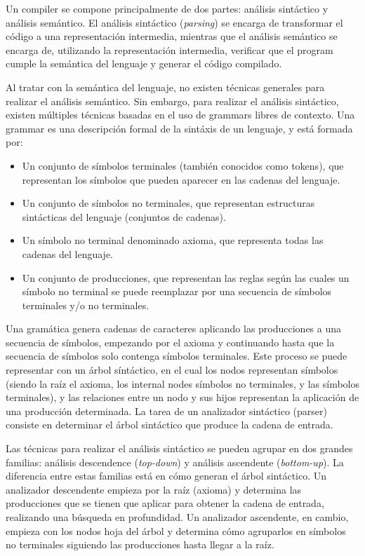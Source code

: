 Un \gls{compiler} se compone principalmente de dos partes: análisis sintáctico y
análisis semántico. El análisis sintáctico (\textit{parsing}) se encarga de
transformar el código a una representación intermedia, mientras que el análisis
semántico se encarga de, utilizando la representación intermedia, verificar que
el \gls{program} cumple la semántica del lenguaje y generar el código compilado.
\parencite{dragon-book}

Al tratar con la semántica del lenguaje, no existen técnicas generales para
realizar el análisis semántico. Sin embargo, para realizar el análisis
sintáctico, existen múltiples técnicas basadas en el uso de \glspl{grammar}
libres de contexto. Una \gls{grammar} es una descripción formal de la sintáxis
de un lenguaje, y está formada por: \parencite{dragon-book}

\begin{itemize}
    \item Un conjunto de símbolos terminales (también conocidos como
    \glspl{token}), que representan los símbolos que pueden aparecer en las
    cadenas del lenguaje.
    \item Un conjunto de símbolos no terminales, que representan estructuras
    sintácticas del lenguaje (conjuntos de cadenas).
    \item Un símbolo no terminal denominado axioma, que representa todas las
    cadenas del lenguaje.
    \item Un conjunto de producciones, que representan las reglas según las
    cuales un símbolo no terminal se puede reemplazar por una secuencia de
    símbolos terminales y/o no terminales.
\end{itemize}

Una gramática genera cadenas de caracteres aplicando las producciones a una
secuencia de símbolos, empezando por el axioma y continuando hasta que la
secuencia de símbolos solo contenga símbolos terminales. Este proceso se puede
representar con un árbol síntáctico, en el cual los nodos representan símbolos
(siendo la raíz el axioma, los \glspl{internal node} símbolos no terminales, y
las  símbolos terminales), y las relaciones entre un
nodo y sus hijos representan la aplicación de una producción determinada. La
tarea de un analizador sintáctico (\gls{parser}) consiste en determinar el árbol
sintáctico que produce la cadena de entrada. \parencite{dragon-book}

Las técnicas para realizar el análisis sintáctico se pueden agrupar en dos
grandes familias: análisis descendence (\textit{top-down}) y análisis ascendente
(\textit{bottom-up}). La diferencia entre estas familias está en cómo generan el
árbol sintáctico. Un analizador descendente empieza por la raíz (axioma) y
determina las producciones que se tienen que aplicar para obtener la cadena de
entrada, realizando una búsqueda en profundidad. Un analizador ascendente, en
cambio, empieza con los nodos hoja del árbol y determina cómo agruparlos en
símbolos no terminales siguiendo las producciones hasta llegar a la raíz.
\parencite{dragon-book}

